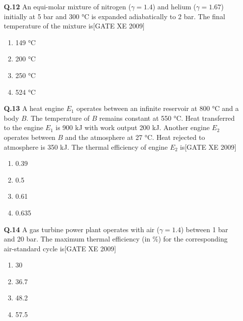 \documentclass[journal,12pt,onecolumn]{IEEEtran}
\theoremstyle{remark}
\begin{document}
\begin{enumerate}
\vspace{0.3cm}

\item[\textbf{Q.12}] An equi-molar mixture of nitrogen ($\gamma=1.4$) and helium ($\gamma=1.67$) initially at 5 bar and 300 °C is expanded adiabatically to 2 bar. The final temperature of the mixture is\hfill[GATE XE 2009]
\begin{multicols}{2}
\begin{enumerate}
    \item 149 °C
    \item 200 °C
    \item 250 °C
    \item 524 °C
\end{enumerate}
\end{multicols}

\vspace{0.3cm}

\item[\textbf{Q.13}]A heat engine $E_1$ operates between an infinite reservoir at 800 °C and a body $B$. The temperature of $B$ remains constant at 550 °C. Heat transferred to the engine $E_1$ is 900 kJ with work output 200 kJ. Another engine $E_2$ operates between $B$ and the atmosphere at 27 °C. Heat rejected to atmosphere is 350 kJ. The thermal efficiency of engine $E_2$ is\hfill[GATE XE 2009]
\begin{multicols}{2}
\begin{enumerate}
    \item 0.39
    \item 0.5
    \item 0.61
    \item 0.635
\end{enumerate}
\end{multicols}

\vspace{0.3cm}

\item[\textbf{Q.14}] A gas turbine power plant operates with air ($\gamma=1.4$) between 1 bar and 20 bar. The maximum thermal efficiency (in \%) for the corresponding air-standard cycle is\hfill[GATE XE 2009]
\begin{multicols}{2}
\begin{enumerate}
    \item 30
    \item 36.7
    \item 48.2
    \item 57.5
\end{enumerate}
\end{multicols}


\end{enumerate}
\end{document}
